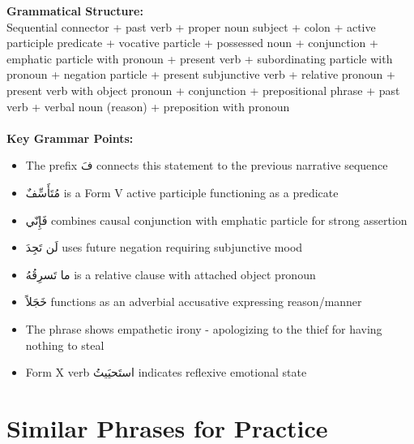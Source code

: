 \documentclass[a4paper,12pt]{article}
\begin{document}
\begin{tcolorbox}[colback=boxcolor,colframe=headercolor]
\textbf{Grammatical Structure:}\\
Sequential connector + past verb + proper noun subject + colon + active participle predicate + vocative particle + possessed noun + conjunction + emphatic particle with pronoun + present verb + subordinating particle with pronoun + negation particle + present subjunctive verb + relative pronoun + present verb with object pronoun + conjunction + prepositional phrase + past verb + verbal noun (reason) + preposition with pronoun \\
\\
\textbf{Key Grammar Points:}
\begin{itemize}
\item The prefix \textarabic{فَ} connects this statement to the previous narrative sequence
\item \textarabic{مُتَأَسِّفٌ} is a Form V active participle functioning as a predicate
\item \textarabic{فَإِنّي} combines causal conjunction with emphatic particle for strong assertion
\item \textarabic{لَن تَجِدَ} uses future negation requiring subjunctive mood
\item \textarabic{ما تَسرِقُهُ} is a relative clause with attached object pronoun
\item \textarabic{خَجَلاً} functions as an adverbial accusative expressing reason/manner
\item The phrase shows empathetic irony - apologizing to the thief for having nothing to steal
\item Form X verb \textarabic{استَحيَيتُ} indicates reflexive emotional state
\end{itemize}
\end{tcolorbox}

\section{Similar Phrases for Practice}
\end{document}
